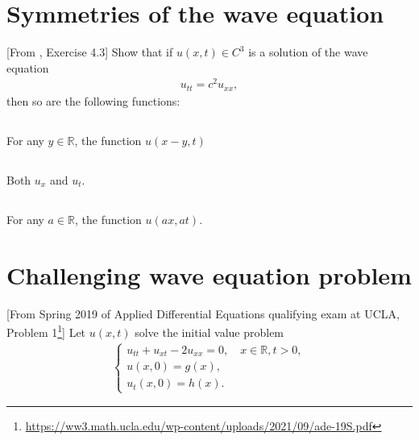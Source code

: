 \documentclass[11pt,letterpaper]{article}
\begin{document}



\section{Symmetries of the wave equation}
[From \cite{ShearerLevy_15}, Exercise 4.3] Show that if $u(x,t)\in C^3$ is a solution of the wave equation
\begin{align}
    u_{tt} = c^2u_{xx},
\end{align}
then so are the following functions:

\subsection{}
For any $y\in\mathbb{R}$, the function $u(x-y,t)$

\subsection{}
Both $u_x$ and $u_t$.

\subsection{}
For any $a\in\mathbb{R}$, the function $u(ax,at)$. 

\section{Challenging wave equation problem}
[From Spring 2019 of Applied Differential Equations qualifying exam at UCLA, Problem 1\footnote{\url{https://ww3.math.ucla.edu/wp-content/uploads/2021/09/ade-19S.pdf}}]  Let $u(x,t)$ solve the initial value problem
\begin{align}
    \begin{cases}
        u_{tt}+u_{xt}-2u_{xx} = 0,\quad x\in\mathbb{R}, t>0,\\
        u(x,0) = g(x),\\
        u_t(x,0) = h(x).
    \end{cases}
\end{align}
\end{document}
